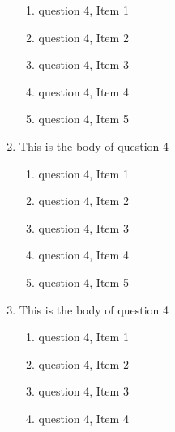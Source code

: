 \documentclass{article}
\begin{document}
\begin{enumerate}
  \begin{enumerate}

    \item
    question 4, Item 1

    \item
    question 4, Item 2

    \item
    question 4, Item 3

    \item
    question 4, Item 4

    \item
    question 4, Item 5

  \end{enumerate}

\item
This is the body of question 4

  \begin{enumerate}

    \item
    question 4, Item 1

    \item
    question 4, Item 2

    \item
    question 4, Item 3

    \item
    question 4, Item 4

    \item
    question 4, Item 5

  \end{enumerate}

\item
This is the body of question 4

  \begin{enumerate}

    \item
    question 4, Item 1

    \item
    question 4, Item 2

    \item
    question 4, Item 3

    \item
    question 4, Item 4


\end{enumerate}
\end{enumerate}
\end{document}
